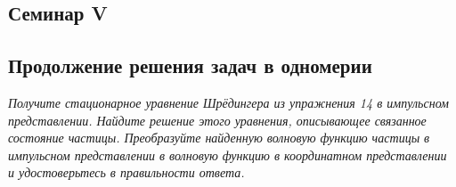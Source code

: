 \begin{center}
    \section{Семинар V}
\end{center}
\subsection{Продолжение решения задач в одномерии}
\begin{center}
    \textit{Получите стационарное уравнение Шрёдингера из упражнения 14 в импульсном представлении. Найдите решение этого уравнения, описывающее связанное состояние частицы. Преобразуйте найденную волновую функцию частицы в импульсном представлении в волновую функцию в координатном представлении и удостоверьтесь в правильности ответа.}
\end{center}

